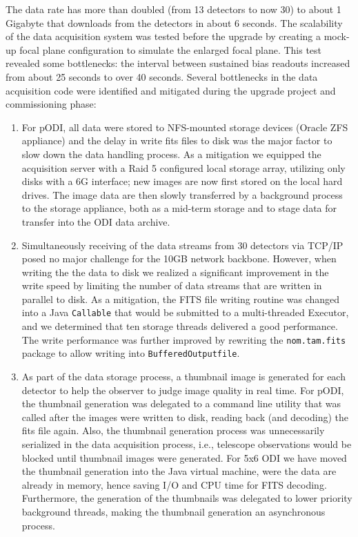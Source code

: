 \documentclass[]{spieman}
\begin{document}
The data rate has more than doubled (from 13 detectors to now 30) to about 1 Gigabyte that 
downloads from the detectors in about 6 seconds.  The scalability of
the data acquisition system was tested before the upgrade by creating a mock-up
focal plane  configuration to simulate the enlarged focal plane. This test
revealed some bottlenecks: the interval between sustained bias readouts
increased from about 25 seconds to over 40 seconds. Several bottlenecks in the
data acquisition code were identified and mitigated during the upgrade project
and commissioning phase:


\begin{enumerate} 
    
\item For pODI, all data were stored to NFS-mounted storage devices (Oracle ZFS appliance)
 and the delay in  write fits files to disk was the major factor to
slow down the data handling process. As a mitigation we equipped the acquisition
server with a Raid 5 configured local storage array, utilizing only disks with a
6G interface; new images are now first stored on the local hard drives. The image data 
are then slowly transferred by a background process to the storage appliance, 
both as a mid-term storage and to stage data for transfer into the ODI data archive.

\item   Simultaneously receiving of the data streams from 30 detectors via TCP/IP posed no
major challenge for the 10GB network backbone.  However, when writing the the
data to disk we realized a significant  improvement in the write speed by
limiting the number of data streams that are written in parallel to disk. As a
mitigation, the FITS file writing routine was changed into a Java {\tt Callable} that would
be submitted to a multi-threaded Executor, and we determined that ten storage threads delivered
a good performance. The write performance was further improved by rewriting the {\tt nom.tam.fits} package
to allow writing into {\tt BufferedOutputfile}. 

\item As part of the data storage process, a thumbnail image is generated for
each detector to help the observer to judge image quality in real time. For
pODI, the thumbnail generation was delegated to a command line utility that was
called after the images were written to disk, reading back (and decoding) the
fits file again. Also, the thumbnail generation process was unnecessarily
serialized in the data acquisition process, i.e., telescope observations would
be blocked until thumbnail images were generated.  For 5x6 ODI we have moved the
thumbnail generation into the Java virtual machine, were the data are already in memory, hence
saving I/O and CPU time for FITS decoding. Furthermore, the generation of the
thumbnails was delegated to  lower priority background threads, making the
thumbnail generation an asynchronous process.

    
\end{enumerate}
\end{document}
